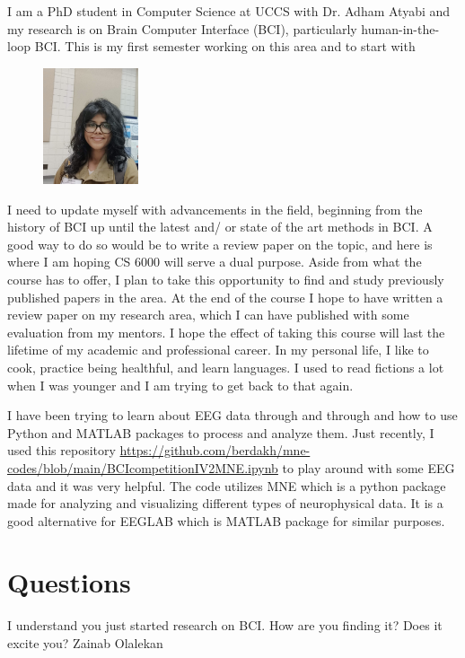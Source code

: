 

% 


I am a PhD student in Computer Science at UCCS with Dr. Adham Atyabi and my research is on Brain Computer Interface (BCI), particularly human-in-the-loop BCI. This is my first semester working on this area and to start with 
\begin{figure} %
    \centering
    \includegraphics[width=0.25\textwidth]{Raisa_Nusrat.jpg}
\end{figure}
I need to update myself with advancements in the field, beginning from the history of BCI up until the latest and/ or state of the art methods in BCI. A good way to do so would be to write a review paper on the topic, and here is where I am hoping CS 6000 will serve a dual purpose. Aside from what the course has to offer, I plan to take this opportunity to find and study previously published papers in the area. At the end of the course I hope to have written a review paper on my research area, which I can have published with some evaluation from my mentors. I hope the effect of taking this course will last the lifetime of my academic and professional career. In my personal life, I like to cook, practice being healthful, and learn languages. I used to read fictions a lot when I was younger and I am trying to get back to that again. 
\vspace{.25 cm}

I have been trying to learn about EEG data through and through and how to use Python and MATLAB packages to process and analyze them. Just recently, I used this repository \url{https://github.com/berdakh/mne-codes/blob/main/BCIcompetitionIV2MNE.ipynb} to play around with some EEG data and it was very helpful. The code utilizes MNE which is a python package made for analyzing and visualizing different types of neurophysical data. It is a good alternative for EEGLAB which is MATLAB package for similar purposes.

\section{Questions}

I understand you just started research on BCI. How are you finding it? Does it excite you? Zainab Olalekan

%
